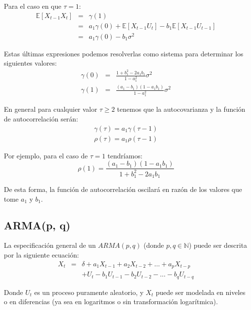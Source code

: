 \documentclass[
]{book}
\begin{document}
Para el caso en que \(\tau = 1\): \begin{eqnarray}
    \mathbb{E}[X_{t-1} X_t] & = & \gamma(1) \nonumber \\
    & = & a_1 \gamma(0) + \mathbb{E}[X_{t-1} U_t] - b_1 \mathbb{E}[X_{t-1} U_{t-1}] \nonumber \\
    & = & a_1 \gamma(0) - b_1 \sigma^2
\end{eqnarray}

Estas últimas expresiones podemos resolverlas como sistema para determinar los siguientes valores:
\begin{eqnarray}
    \gamma(0) & = & \frac{1 + b_1^2 - 2 a_1 b_1}{1 - a_1^2} \sigma^2 \\
    \gamma(1) & = & \frac{(a_1 - b_1)(1 - a_1 b_1)}{1 - a_1^2} \sigma^2
\end{eqnarray}

En general para cualquier valor \(\tau \geq 2\) tenemos que la autocovarianza y la función de autocorrelación serán:
\begin{eqnarray}
    \gamma(\tau) = a_1 \gamma(\tau - 1) \\
    \rho(\tau) = a_1 \rho(\tau - 1)
\end{eqnarray}

Por ejemplo, para el caso de \(\tau = 1\) tendríamos:
\begin{equation}
    \rho(1) = \frac{(a_1 - b_1)(1 - a_1 b_1)}{1 + b_1^2 - 2 a_1 b_1}
\end{equation}

De esta forma, la función de autocorrelación oscilará en razón de los valores que tome \(a_1\) y \(b_1\).

\hypertarget{armap-q}{%
\subsection{ARMA(p, q)}\label{armap-q}}

La especificación general de un \(ARMA(p, q)\) (donde \(p, q \in \mathbb{N}\)) puede ser descrita por la siguiente ecuación:
\begin{eqnarray}
    X_t & = & \delta + a_1 X_{t - 1} + a_2 X_{t - 2} + \ldots + a_p X_{t - p} \nonumber \\
    &   & + U_t - b_1 U_{t - 1} - b_2  U_{t - 2} - \ldots - b_q  U_{t - q}
    \label{eq:ARMApqEq}
\end{eqnarray}

Donde \(U_t\) es un proceso puramente aleatorio, y \(X_t\) puede ser modelada en niveles o en diferencias (ya sea en logaritmos o sin
transformación logarítmica).
\end{document}
